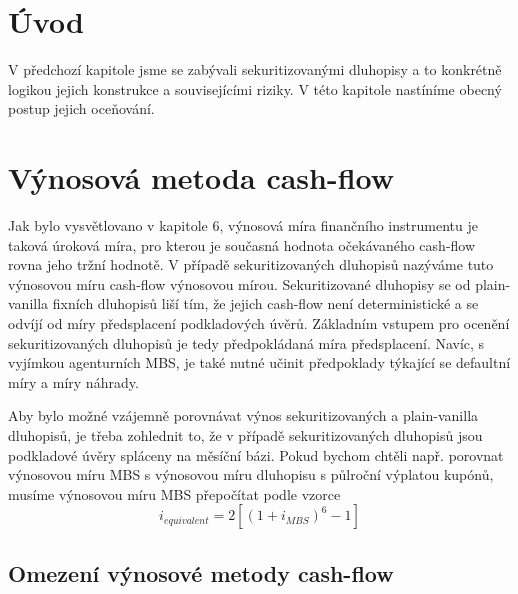 \documentclass[a4paper]{book}
\begin{document}
\section{Úvod}

V předchozí kapitole jsme se zabývali sekuritizovanými dluhopisy a to konkrétně logikou jejich konstrukce a souvisejícími riziky. V této kapitole nastíníme obecný postup jejich oceňování.

\section{Výnosová metoda cash-flow}

Jak bylo vysvětlovano v kapitole 6, výnosová míra finančního instrumentu je taková úroková míra, pro kterou je současná hodnota očekávaného cash-flow rovna jeho tržní hodnotě. V případě sekuritizovaných dluhopisů nazýváme tuto výnosovou míru cash-flow výnosovou mírou. Sekuritizované dluhopisy se od plain-vanilla fixních dluhopisů liší tím, že jejich cash-flow není deterministické a se odvíjí od míry předsplacení podkladových úvěrů. Základním vstupem pro ocenění sekuritizovaných dluhopisů je tedy předpokládaná míra předsplacení. Navíc, s vyjímkou agenturních MBS, je také nutné učinit předpoklady týkající se defaultní míry a míry náhrady.

Aby bylo možné vzájemně porovnávat výnos sekuritizovaných a plain-vanilla dluhopisů, je třeba zohlednit to, že v případě sekuritizovaných dluhopisů jsou podkladové úvěry spláceny na měsíční bázi. Pokud bychom chtěli např. porovnat výnosovou míru MBS s výnosovou míru dluhopisu s půlroční výplatou kupónů, musíme výnosovou míru MBS přepočítat podle vzorce
\begin{equation*}
i_{equivalent} = 2[(1 + i_{MBS})^6 - 1]
\end{equation*}

\subsection{Omezení výnosové metody cash-flow}
\end{document}
